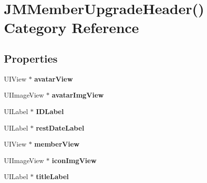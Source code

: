 \hypertarget{category_j_m_member_upgrade_header_07_08}{}\section{J\+M\+Member\+Upgrade\+Header() Category Reference}
\label{category_j_m_member_upgrade_header_07_08}
\subsection*{Properties}
\begin{DoxyCompactItemize}
\item 
\mbox{\label{category_j_m_member_upgrade_header_07_08_a9fe28b2c2a91366a7e99bea132d74091}} 
U\+I\+View $\ast$ {\bfseries avatar\+View}
\item 
\mbox{\label{category_j_m_member_upgrade_header_07_08_acd855286627d735e34db5f17f6a8342d}} 
U\+I\+Image\+View $\ast$ {\bfseries avatar\+Img\+View}
\item 
\mbox{\label{category_j_m_member_upgrade_header_07_08_a406daa6a82a5d46e6bac56fc2f45082d}} 
U\+I\+Label $\ast$ {\bfseries I\+D\+Label}
\item 
\mbox{\label{category_j_m_member_upgrade_header_07_08_a31c501cb95301784dbf17bdf5853c090}} 
U\+I\+Label $\ast$ {\bfseries rest\+Date\+Label}
\item 
\mbox{\label{category_j_m_member_upgrade_header_07_08_a98a461a1839cace431f35239099bef05}} 
U\+I\+View $\ast$ {\bfseries member\+View}
\item 
\mbox{\label{category_j_m_member_upgrade_header_07_08_aceeeb89f35e77af76c9f437340384943}} 
U\+I\+Image\+View $\ast$ {\bfseries icon\+Img\+View}
\item 
\mbox{\label{category_j_m_member_upgrade_header_07_08_a80cb7447674186a13910b7752fd462c0}} 
U\+I\+Label $\ast$ {\bfseries title\+Label}
\item 

\end{DoxyCompactItemize}
